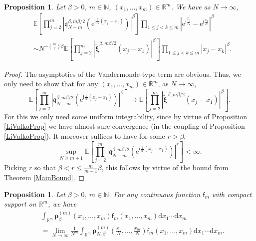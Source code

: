 \documentclass[]{article}
\newtheorem{prop}[thm]{Proposition}
\begin{document}
\begin{prop}\label{PropAsymptCorr}
Let $\beta>0$, $m\in \mathbb{N}$, $(x_1,\dots,x_m)\in \mathbb{R}^m$. We have as $N \to \infty$,
\begin{align*}
&\mathbb{E}\left[\prod_{j=2}^m \left|\mathfrak{q}_{N-m}^{\beta,m\beta/2}\left(\mathrm{e}^{\mathrm{i}\frac{1}{N}(x_j-x_1)}\right)\right|^{\beta}\right] \prod_{1\le j <k \le m}\left|\mathrm{e}^{\mathrm{i}\frac{x_j}{N}}-\mathrm{e}^{\mathrm{i}\frac{x_k}{N}}\right|^\beta \\
&\sim N^{-\binom{m}{2}\beta}\mathbb{E}\left[\prod_{j=2}^m\left|\tilde{\boldsymbol{\xi}}^{\beta,m \beta/2}(x_j-x_1)\right|^\beta\right] \prod_{1 \le j <k \le m}\left|x_j-x_k\right|^\beta.
\end{align*}
\end{prop}
\begin{proof}
The asymptotics of the Vandermonde-type term are obvious. Thus, we only need to show that for any $(x_1,\dots,x_m)\in \mathbb{R}^m$, as $N \to \infty$,
\begin{equation*}
\mathbb{E}\left[\prod_{j=2}^m \left|\mathfrak{q}_{N-m}^{\beta,m\beta/2}\left(\mathrm{e}^{\mathrm{i}\frac{1}{N}(x_j-x_1)}\right)\right|^{\beta}\right] \longrightarrow \mathbb{E}\left[\prod_{j=2}^m\left|\tilde{\boldsymbol{\xi}}^{\beta,m \beta/2}(x_j-x_1)\right|^\beta\right].
\end{equation*}
For this we only need some uniform integrability, since by virtue of Proposition \ref{LiValkoProp} we have almost sure convergence (in the coupling of Proposition \ref{LiValkoProp}). It moreover suffices to have for some $r>\beta$, 
\begin{equation*}
\sup_{N\ge m+1}\mathbb{E}\left[\prod_{j=2}^m\left|\mathfrak{q}_{N-m}^{\beta,m\beta/2}\left(\mathrm{e}^{\mathrm{i}\frac{1}{N}(x_j-x_1)}\right)\right|^r\right]<\infty.
\end{equation*}
Picking $r$ so that $\beta<r\le\frac{m}{m-1}\beta$, this follows by virtue of the bound from Theorem \ref{MainBound}.
\end{proof}

\begin{prop}\label{LimitOfCorr}
Let $\beta>0$, $m \in \mathbb{N}$. For any continuous function $\mathsf{f}_m$ with compact support on $\mathbb{R}^m$, we have
\begin{align*}
&\int_{\mathbb{R}^m}\boldsymbol{\rho}_\beta^{(m)}(x_1,\dots,x_m)\mathsf{f}_m(x_1,\dots,x_m)\mathrm{d}x_1\cdots\mathrm{d}x_m\\&=\lim_{N\to \infty} \frac{1}{N^m}\int_{\mathbb{R}^m}\boldsymbol{\rho}_{N,\beta}^{(m)}\left(\frac{x_1}{N},\dots,\frac{x_m}{N}\right)\mathsf{f}_m(x_1,\dots,x_m)\mathrm{d}x_1\cdots\mathrm{d}x_m.
\end{align*}
\end{prop}
\end{document}
